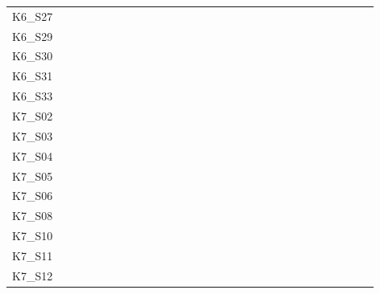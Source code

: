 \begin{table}[htpb]
\begin{tabular}{l|rrrrrrrrrrrrrrrrrrrrrrrrrrrr}
        K6\_S27 & \y & \y & \y & \y & \y & \y & \y & \y & \y & \y & \y & \y & \y & \y & \y & \y & \y & \y & \y & \y & \y & \y & \y & \y & \y & \y & \y & \y \\
        K6\_S29 & \y & \y & \y & \y & \y & \y & \y & \y & \y & \y & \y & \y & \y & \y & \y & \y & \y & \y & \y & \y & \y & \y & \y & \y & \y & \y & \y & \y \\
        K6\_S30 & \y & \y & \y & \y & \y & \y & \y & \y & \y & \y & \y & \y & \y & \y & \y & \y & \y & \y & \y & \y & \y & \y & \y & \y & \y & \y & \y & \y \\
        K6\_S31 & \y & \y & \y & \y & \y & \y & \y & \y & \y & \y & \y & \y & \y & \y & \y & \y & \y & \y & \y & \y & \y & \y & \y & \y & \y & \y & \y & \y \\
        K6\_S33 & \y & \y & \y & \y & \y & \y & \y & \x & \y & \y & \y & \y & \y & \y & \y & \y & \y & \y & \y & \y & \y & \y & \y & \y & \y & \y & \y & \y \\
        K7\_S02 & \y & \y & \y & \y & \y & \y & \y & \y & \y & \y & \y & \y & \y & \y & \y & \y & \y & \y & \y & \y & \x & \y & \y & \y & \y & \y & \x & \y \\
        K7\_S03 & \y & \y & \y & \y & \y & \y & \y & \y & \y & \y & \y & \y & \x & \y & \y & \y & \y & \y & \y & \y & \y & \y & \y & \y & \y & \y & \y & \y \\
        K7\_S04 & \y & \y & \y & \y & \y & \y & \y & \y & \y & \y & \y & \y & \y & \y & \y & \y & \y & \y & \y & \y & \y & \y & \y & \y & \y & \y & \y & \y \\
        K7\_S05 & \y & \y & \y & \y & \y & \y & \y & \y & \y & \y & \y & \y & \y & \y & \y & \y & \y & \y & \y & \y & \y & \y & \y & \y & \y & \y & \y & \y \\
        K7\_S06 & \y & \y & \y & \y & \y & \y & \y & \y & \y & \y & \y & \y & \y & \y & \y & \y & \y & \y & \y & \y & \y & \y & \y & \y & \y & \y & \y & \y \\
        K7\_S08 & \y & \y & \y & \y & \y & \y & \y & \y & \y & \y & \y & \y & \y & \y & \y & \y & \y & \y & \y & \y & \y & \y & \y & \y & \y & \y & \y & \y \\
        K7\_S10 & \y & \y & \y & \y & \y & \y & \y & \y & \y & \y & \y & \y & \y & \y & \y & \y & \y & \y & \y & \y & \x & \y & \y & \y & \y & \y & \y & \y \\
        K7\_S11 & \y & \y & \y & \y & \y & \y & \y & \y & \y & \y & \y & \y & \y & \y & \y & \y & \y & \y & \y & \y & \y & \y & \y & \y & \y & \y & \y & \y \\
        K7\_S12 & \y & \y & \y & \y & \y & \y & \y & \y & \y & \y & \y & \y & \y & \x & \y & \y & \y & \y & \y & \y & \y & \y & \y & \y & \y & \y & \y & \y \\

\end{tabular}
\end{table}
